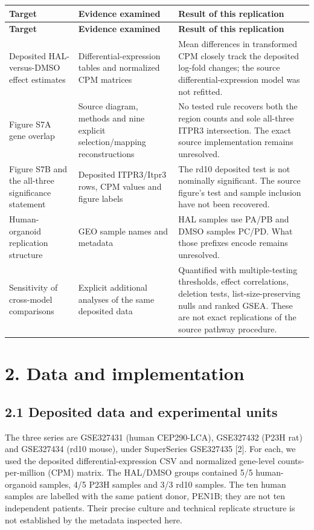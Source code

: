 \documentclass[a4paper,10pt]{article}
\begin{document}
{\small
\begin{longtable}{>{\raggedright\arraybackslash}p{}>{\raggedright\arraybackslash}p{}>{\raggedright\arraybackslash}p{}}
\toprule
\textbf{Target} & \textbf{Evidence examined} & \textbf{Result of this replication} \\
\midrule
\endfirsthead
\toprule
\textbf{Target} & \textbf{Evidence examined} & \textbf{Result of this replication} \\
\midrule
\endhead
\bottomrule\endfoot
Deposited HAL-versus-DMSO effect estimates & Differential-expression tables and normalized CPM matrices & Mean differences in transformed CPM closely track the deposited log-fold changes; the source differential-expression model was not refitted. \\
Figure S7A gene overlap & Source diagram, methods and nine explicit selection/mapping reconstructions & No tested rule recovers both the region counts and sole all-three ITPR3 intersection. The exact source implementation remains unresolved. \\
Figure S7B and the all-three significance statement & Deposited ITPR3/Itpr3 rows, CPM values and figure labels & The rd10 deposited test is not nominally significant. The source figure's test and sample inclusion have not been recovered. \\
Human-organoid replication structure & GEO sample names and metadata & HAL samples use PA/PB and DMSO samples PC/PD. What those prefixes encode remains unresolved. \\
Sensitivity of cross-model comparisons & Explicit additional analyses of the same deposited data & Quantified with multiple-testing thresholds, effect correlations, deletion tests, list-size-preserving nulls and ranked GSEA. These are not exact replications of the source pathway procedure. \\
\end{longtable}
}
\section*{2. Data and implementation}
\subsection*{2.1 Deposited data and experimental units}
The three series are GSE327431 (human CEP290-LCA), GSE327432 (P23H rat) and GSE327434 (rd10 mouse), under SuperSeries GSE327435 [2]. For each, we used the deposited differential-expression CSV and normalized gene-level counts-per-million (CPM) matrix. The HAL/DMSO groups contained 5/5 human-organoid samples, 4/5 P23H samples and 3/3 rd10 samples. The ten human samples are labelled with the same patient donor, PEN1B; they are not ten independent patients. Their precise culture and technical replicate structure is not established by the metadata inspected here.
\end{document}
